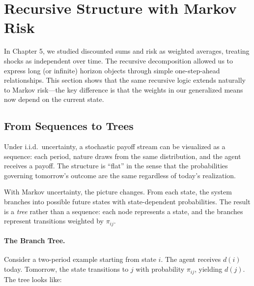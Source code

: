 
\section{Recursive Structure with Markov Risk}
\label{sec:recursive-markov}

In Chapter 5, we studied discounted sums and risk as weighted averages, treating shocks as independent over time. The recursive decomposition allowed us to express long (or infinite) horizon objects through simple one-step-ahead relationships. This section shows that the same recursive logic extends naturally to Markov risk---the key difference is that the weights in our generalized means now depend on the current state.

\subsection{From Sequences to Trees}
\label{subsec:sequences-to-trees}

Under i.i.d.\ uncertainty, a stochastic payoff stream can be visualized as a sequence: each period, nature draws from the same distribution, and the agent receives a payoff. The structure is ``flat'' in the sense that the probabilities governing tomorrow's outcome are the same regardless of today's realization.

With Markov uncertainty, the picture changes. From each state, the system branches into possible future states with state-dependent probabilities. The result is a \emph{tree} rather than a sequence: each node represents a state, and the branches represent transitions weighted by $\pi_{ij}$.

\paragraph{The Branch Tree.}
Consider a two-period example starting from state $i$. The agent receives $d(i)$ today. Tomorrow, the state transitions to $j$ with probability $\pi_{ij}$, yielding $d(j)$. The tree looks like:

\begin{center}
\end{center}

